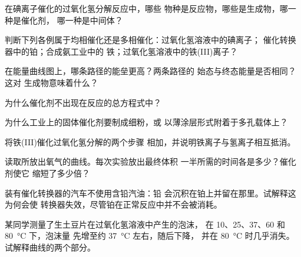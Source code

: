 \begin{exercise}[$\star$]\label{exo:g12:catalysis:1}
在碘离子催化的过氧化氢分解反应中，哪些
物种是反应物，哪些是生成物，哪一种是催化剂，
哪一种是中间体？
\end{exercise}

\begin{exercise}[$\star$]\label{exo:g12:catalysis:2}
判断下列各例属于均相催化还是多相催化：过氧化氢溶液中的碘离子；
催化转换器中的铂；合成氨工业中的
铁；过氧化氢溶液中的铁(III)离子？
\end{exercise}

\begin{exercise}[$\star$]\label{exo:g12:catalysis:3}
在能量曲线图上，哪条路径的能垒更高？两条路径的
始态与终态能量是否相同？这对
生成物意味着什么？
\end{exercise}

\begin{exercise}[$\star$]\label{exo:g12:catalysis:4}
为什么催化剂不出现在反应的总方程式中？
\end{exercise}

\begin{exercise}[$\star$]\label{exo:g12:catalysis:5}
为什么工业上的固体催化剂要制成细粉，或
以薄涂层形式附着于多孔载体上？
\end{exercise}

\begin{exercise}[$\star\star$]\label{exo:g12:catalysis:6}
将铁(III)催化过氧化氢分解的两个步骤
相加，并说明铁离子与氢离子相互抵消。
\end{exercise}

\begin{exercise}[$\star\star$]\label{exo:g12:catalysis:7}
读取所放出氧气的曲线。每次实验放出最终体积
一半所需的时间各是多少？催化剂使它
缩短了多少倍？
\end{exercise}

\begin{exercise}[$\star\star$]\label{exo:g12:catalysis:8}
装有催化转换器的汽车不使用含铅汽油：铅
会沉积在铂上并留在那里。试解释这为何会使
转换器失效，尽管铂在正常反应中并不会被消耗。
\end{exercise}

\begin{exercise}[$\star\star$]\label{exo:g12:catalysis:9}
某同学测量了生土豆片在过氧化氢溶液中产生的泡沫，
在 10、25、37、60 和 \qty{80}{\celsius} 下，泡沫量
先增至约 \qty{37}{\celsius} 左右，随后下降，
并在 \qty{80}{\celsius} 时几乎消失。试解释曲线的两个部分。
\end{exercise}


